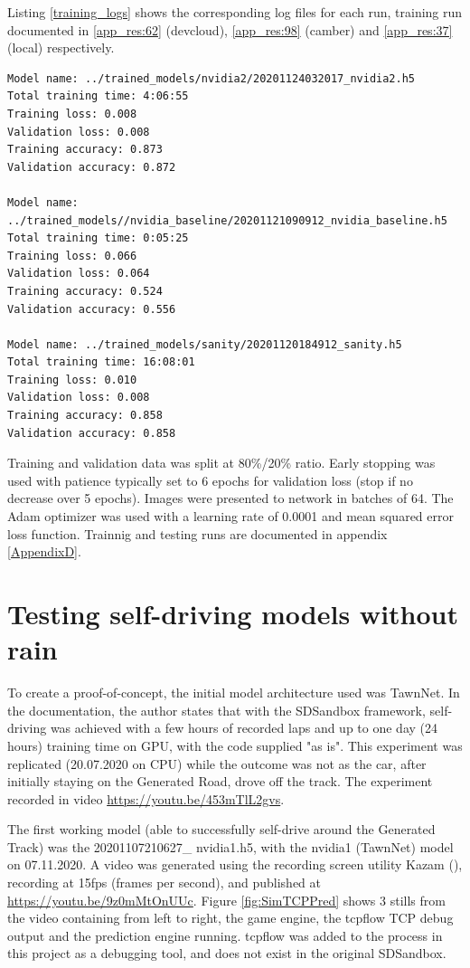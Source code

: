 Listing \ref{training_logs} shows the corresponding log files for each run, training run documented in \ref{app_res:62} (devcloud), \ref{app_res:98} (camber) and \ref{app_res:37} (local) respectively.

\label{training_logs}
\begin{verbatim}
Model name: ../trained_models/nvidia2/20201124032017_nvidia2.h5
Total training time: 4:06:55
Training loss: 0.008
Validation loss: 0.008
Training accuracy: 0.873
Validation accuracy: 0.872

Model name: ../trained_models//nvidia_baseline/20201121090912_nvidia_baseline.h5
Total training time: 0:05:25
Training loss: 0.066
Validation loss: 0.064
Training accuracy: 0.524
Validation accuracy: 0.556

Model name: ../trained_models/sanity/20201120184912_sanity.h5
Total training time: 16:08:01
Training loss: 0.010
Validation loss: 0.008
Training accuracy: 0.858
Validation accuracy: 0.858 
\end{verbatim}

Training and validation data was split at 80\%/20\% ratio. Early stopping was used with patience typically set to 6 epochs for validation loss (stop if no decrease over 5 epochs). Images were presented to network in batches of 64. The Adam optimizer was used with a learning rate of 0.0001 and mean squared error loss function. Trainnig and testing runs are documented in appendix \ref{AppendixD}.

\section{Testing self-driving models without rain}
To create a proof-of-concept, the initial model architecture used was TawnNet. In the documentation, the author states that with the SDSandbox framework, self-driving was achieved with a few hours of recorded laps and up to one day (24 hours) training time on GPU, with the code supplied "as is". This experiment was replicated (20.07.2020 on CPU) while the outcome was not as the car, after initially staying on the Generated Road, drove off the track. The experiment recorded in video  \url{https://youtu.be/453mTlL2gvs}.    

The first working model (able to successfully self-drive around the Generated Track) was the 20201107210627\_ nvidia1.h5, with the nvidia1 (TawnNet) model on 07.11.2020. A video was generated using the recording screen utility Kazam (\cite{Kazam2020}), recording at 15fps (frames per second), and published at  \url{https://youtu.be/9z0mMtOnUUc}. Figure \ref{fig:SimTCPPred}
shows 3 stills from the video containing from left to right, the game engine, the tcpflow TCP debug output and the prediction engine running. tcpflow was added to the process in this project as a debugging tool, and does not exist in the original SDSandbox.


